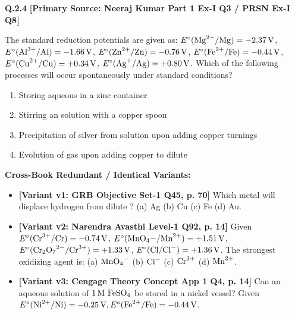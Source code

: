 \begin{problembox}
\textbf{Q.2.4} \hfill \textbf{[Primary Source: Neeraj Kumar Part 1 Ex-I Q3 / PRSN Ex-I Q8]}
\label{q:qb-c2-04}

The standard reduction potentials are given as:
$E^\circ(\ce{Mg^2+/Mg}) = -2.37\,\text{V}$,
$E^\circ(\ce{Al^3+/Al}) = -1.66\,\text{V}$,
$E^\circ(\ce{Zn^2+/Zn}) = -0.76\,\text{V}$,
$E^\circ(\ce{Fe^2+/Fe}) = -0.44\,\text{V}$,
$E^\circ(\ce{Cu^2+/Cu}) = +0.34\,\text{V}$,
$E^\circ(\ce{Ag+/Ag}) = +0.80\,\text{V}$.
Which of the following processes will occur spontaneously under standard conditions?
\begin{enumerate}[label=(\alph*)]
    \item Storing aqueous  in a zinc container
    \item Stirring an  solution with a copper spoon
    \item Precipitation of silver from  solution upon adding copper turnings
    \item Evolution of  gas upon adding copper to dilute 
\end{enumerate}

\tcbline
\textbf{\color{accentamber}Cross-Book Redundant / Identical Variants:}
\begin{itemize}[leftmargin=*,itemsep=2pt]
    \item \textbf{[Variant v1: GRB Objective Set-1 Q45, p. 70]} Which metal will displace hydrogen from dilute ? (a) Ag (b) Cu (c) Fe (d) Au.
    \item \textbf{[Variant v2: Narendra Avasthi Level-1 Q92, p. 14]} Given $E^\circ(\ce{Cr^3+/Cr}) = -0.74\,\text{V}$, $E^\circ(\ce{MnO4-/Mn^2+}) = +1.51\,\text{V}$, $E^\circ(\ce{Cr2O7^2-/Cr^3+}) = +1.33\,\text{V}$, $E^\circ(\ce{Cl/Cl-}) = +1.36\,\text{V}$. The strongest oxidizing agent is: (a) $\ce{MnO4-}$ (b) $\ce{Cl-}$ (c) $\ce{Cr^3+}$ (d) $\ce{Mn^2+}$.
    \item \textbf{[Variant v3: Cengage Theory Concept App 1 Q4, p. 14]} Can an aqueous solution of $1\,\text{M } \ce{FeSO4}$ be stored in a nickel vessel? Given $E^\circ(\ce{Ni^2+/Ni}) = -0.25\,\text{V}, E^\circ(\ce{Fe^2+/Fe}) = -0.44\,\text{V}$.
\end{itemize}
\end{problembox}
